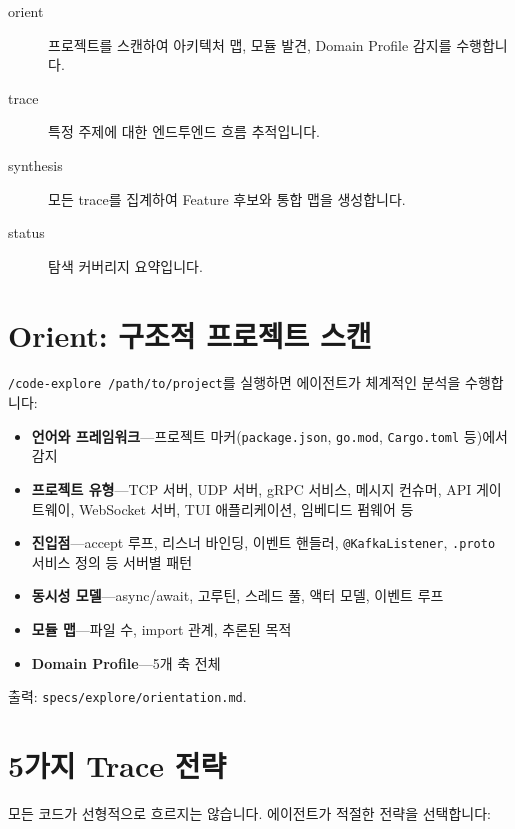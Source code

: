 \documentclass[11pt,a4paper,openright,twoside]{report}
\newcommand{\file}[1]{\texttt{#1}}
\begin{document}
\begin{description}
  \item[orient] 프로젝트를 스캔하여 아키텍처 맵, 모듈 발견, Domain Profile 감지를 수행합니다.
  \item[trace] 특정 주제에 대한 엔드투엔드 흐름 추적입니다.
  \item[synthesis] 모든 trace를 집계하여 Feature 후보와 통합 맵을 생성합니다.
  \item[status] 탐색 커버리지 요약입니다.
\end{description}

\section{Orient: 구조적 프로젝트 스캔}

\texttt{/code-explore /path/to/project}를 실행하면 에이전트가 체계적인 분석을 수행합니다:

\begin{itemize}
  \item \textbf{언어와 프레임워크}---프로젝트 마커(\file{package.json}, \file{go.mod}, \file{Cargo.toml} 등)에서 감지
  \item \textbf{프로젝트 유형}---TCP 서버, UDP 서버, gRPC 서비스, 메시지 컨슈머, API 게이트웨이, WebSocket 서버, TUI 애플리케이션, 임베디드 펌웨어 등
  \item \textbf{진입점}---accept 루프, 리스너 바인딩, 이벤트 핸들러, \texttt{@KafkaListener}, \texttt{.proto} 서비스 정의 등 서버별 패턴
  \item \textbf{동시성 모델}---async/await, 고루틴, 스레드 풀, 액터 모델, 이벤트 루프
  \item \textbf{모듈 맵}---파일 수, import 관계, 추론된 목적
  \item \textbf{Domain Profile}---5개 축 전체
\end{itemize}

출력: \file{specs/explore/orientation.md}.

\section{5가지 Trace 전략}

모든 코드가 선형적으로 흐르지는 않습니다. 에이전트가 적절한 전략을 선택합니다:
\end{document}
